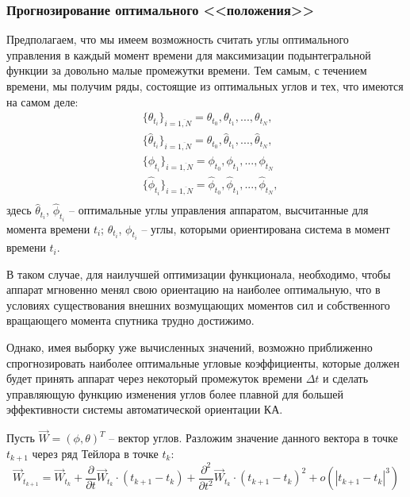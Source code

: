 \subsubsection{Прогнозирование оптимального <<положения>>}
\noindent\indent Предполагаем, что мы имеем возможность считать углы оптимального
управления в каждый момент времени для максимизации подынтегральной функции за довольно
малые промежутки времени. Тем самым, с течением времени, мы получим ряды, состоящие
из оптимальных углов и тех, что имеются на самом деле:
\begin{equation}
  \begin{aligned}
    &\{\theta_{t_i}\}_{i=\overline{1,N}} = \theta_{t_0}, \theta_{t_1}, ..., \theta_{t_N}, \\
    &\{\hat{\theta}_{t_i}\}_{i=\overline{1,N}} = \hat{\theta}_{t_0}, \hat{\theta}_{t_1}, ..., \hat{\theta}_{t_N}, \\
    &\{\phi_{t_i}\}_{i=\overline{1,N}} = \phi_{t_0}, \phi_{t_1}, ..., \phi_{t_N} \\
    &\{\hat{\phi}_{t_i}\}_{i=\overline{1,N}} = \hat{\phi}_{t_0}, \hat{\phi}_{t_1}, ..., \hat{\phi}_{t_N}, \\
  \end{aligned}
\end{equation}
здесь $\hat{\theta}_{t_i}$, $\hat{\phi}_{t_i}$ -- оптимальные углы управления аппаратом,
высчитанные для момента времени $t_i$; $\theta_{t_i}$, $\phi_{t_i}$ -- углы, которыми
ориентирована система в момент времени $t_i$.\par
  В таком случае, для наилучшей оптимизации функционала, необходимо, чтобы
аппарат мгновенно менял свою ориентацию на наиболее оптимальную, что в условиях
существования внешних возмущающих моментов сил и собственного вращающего момента
спутника трудно достижимо.\par
  Однако, имея выборку уже вычисленных значений, возможно приближенно спрогнозировать
наиболее оптимальные угловые коэффициенты, которые должен будет принять аппарат
через некоторый промежуток времени $\Delta t$ и сделать управляющую функцию изменения
углов более плавной для большей эффективности системы автоматической ориентации КА.\par
  Пусть $\vec{W} = (\phi, \theta)^T$ -- вектор углов. Разложим значение данного вектора
в точке $t_{k+1}$ через ряд Тейлора в точке $t_{k}$:
\begin{equation} \label{eq:parialWEquatation}
  \vec{W}_{t_{k+1}} = \vec{W}_{t_{k}}
  + \frac{\partial}{\partial t}\vec{W}_{t_{k}} \cdot (t_{k+1} - t_{k})
  + \frac{\partial^2}{\partial t^2}\vec{W}_{t_{k}} \cdot (t_{k+1} - t_{k})^2
  + o(|t_{k+1} - t_{k}|^3)
\end{equation}\par

